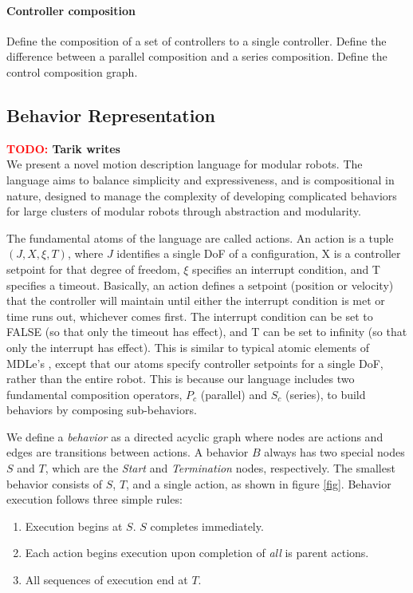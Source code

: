 \documentclass[conference]{IEEEtran}
\theoremstyle{definition}
\newcommand{\TODO}[1]{ {\bf \textcolor{red}{TODO:} #1 }}
\begin{document}
\paragraph{Controller composition}
Define the composition of a set of controllers to a single controller. Define the difference between a parallel composition and a series composition. Define the control composition graph.

\subsection{Behavior Representation}
\label{sec:behavior-representation}
\TODO{Tarik writes} \\

We present a novel motion description language for modular robots.  The
language aims to balance simplicity and expressiveness, and is compositional in
nature, designed to manage the complexity of developing complicated behaviors
for large clusters of modular robots through abstraction and modularity.

The fundamental atoms of the language are called actions.  An action is a tuple \(
(J, X, \xi, T)\), where \(J\) identifies a single DoF of a configuration, X is a
controller setpoint for that degree of freedom, \(\xi\) specifies an interrupt
condition, and T specifies a timeout.  Basically, an action defines a setpoint
(position or velocity) that the controller will maintain until either the
interrupt condition is met or time runs out, whichever comes first.  The
interrupt condition can be set to FALSE (so that only the timeout has effect),
and T can be set to infinity (so that only the interrupt has effect).  This is
similar to typical atomic elements of MDLe's \cite{mlePaper}, except that our
atoms specify controller setpoints for a single DoF, rather than the entire
robot.  This is because our language includes two fundamental composition operators,
\(P_c\) (parallel) and \(S_c\) (series), to build behaviors by composing sub-behaviors.

We define a \textit{behavior} as a directed acyclic graph where nodes are actions and
edges are transitions between actions.  A behavior \(B\) always has two
special nodes \(S\) and \(T\), which are the \textit{Start} and \textit{Termination} nodes, respectively.
The smallest behavior consists of \(S\), \(T\), and a single action, as shown in figure
\ref{fig}.  Behavior execution follows three simple rules:

\begin{enumerate}
\item Execution begins at \(S\).  \(S\) completes immediately.
\item Each action begins execution upon completion of \textit{all} is parent actions.
\item All sequences of execution end at \(T\).
\end{enumerate}
\end{document}
